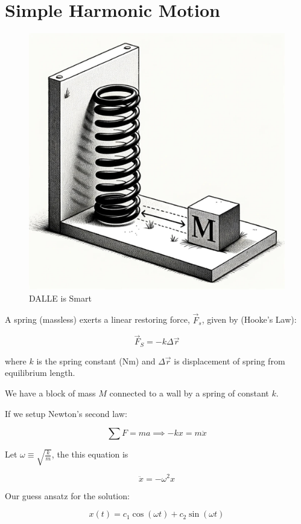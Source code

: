 \section{Simple Harmonic Motion}

\begin{figure}[H]
	\centering
	\includegraphics[width=0.5\linewidth]{assets/spring2wall.jpg}
	\caption{DALLE is Smart}
\end{figure}
A spring (massless) exerts a linear restoring force, $\vec F_s$, given by (Hooke's Law):

\begin{equation}
	\vec F_S = - k \Delta \vec r
\end{equation}

where $k$ is the spring constant ($\si{\N\m}$) and $\Delta \vec r$ is displacement of spring from equilibrium length.

\begin{example}
	We have a block of mass $M$ connected to a wall by a spring of constant $k$.
\end{example}

If we setup Newton's second law:

\begin{equation}
	\sum F = ma \implies -kx = m \ddot x
\end{equation}

Let $\omega \equiv \sqrt{\frac{k}{m}}$, the this equation is 

\begin{equation}
	\boxed{\ddot x = -\omega^2 x}
\end{equation}

Our guess ansatz for the solution:

\begin{equation} \label{eq:shm-general-sol}
	x(t) = c_1 \cos(\omega t) + c_2 \sin(\omega t)
\end{equation}

